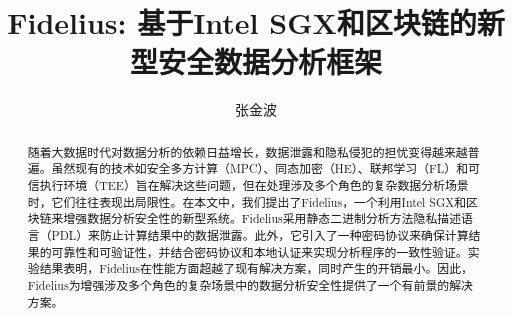 \documentclass[sigconf]{acmart}
\begin{document}
\title{Fidelius: 基于Intel SGX和区块链的新型安全数据分析框架}

\author{张金波}

\begin{abstract}
随着大数据时代对数据分析的依赖日益增长，数据泄露和隐私侵犯的担忧变得越来越普遍。虽然现有的技术如安全多方计算（MPC）、同态加密（HE）、联邦学习（FL）和可信执行环境（TEE）旨在解决这些问题，但在处理涉及多个角色的复杂数据分析场景时，它们往往表现出局限性。在本文中，我们提出了Fidelius，一个利用Intel SGX和区块链来增强数据分析安全性的新型系统。Fidelius采用静态二进制分析方法隐私描述语言（PDL）来防止计算结果中的数据泄露。此外，它引入了一种密码协议来确保计算结果的可靠性和可验证性，并结合密码协议和本地认证来实现分析程序的一致性验证。实验结果表明，Fidelius在性能方面超越了现有解决方案，同时产生的开销最小。因此，Fidelius为增强涉及多个角色的复杂场景中的数据分析安全性提供了一个有前景的解决方案。
\end{abstract}


\maketitle











\end{document}
